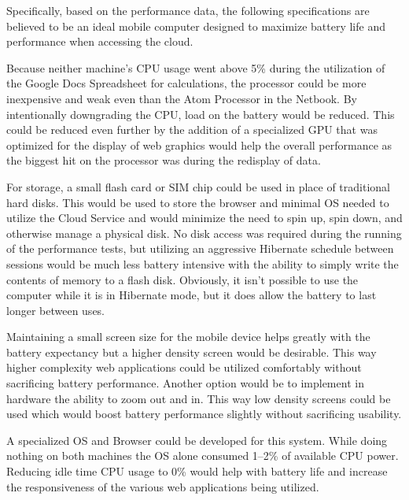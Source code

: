 Specifically, based on the performance data, the following specifications are
believed to be an ideal mobile computer designed to maximize battery life and
performance when accessing the cloud.

Because neither machine's CPU usage went above 5\% during the utilization of the
Google Docs Spreadsheet for calculations, the processor could be more
inexpensive and weak even than the Atom Processor in the Netbook.  By
intentionally downgrading the CPU, load on the battery would be reduced.  This
could be reduced even further by the addition of a specialized GPU that was
optimized for the display of web graphics would help the overall performance as
the biggest hit on the processor was during the redisplay of data.

For storage, a small flash card or SIM chip could be used in place of
traditional hard disks.  This would be used to store the browser and minimal OS
needed to utilize the Cloud Service and would minimize the need to spin up, spin
down, and otherwise manage a physical disk.  No disk access was required during
the running of the performance tests, but utilizing an aggressive Hibernate
schedule between sessions would be much less battery intensive with the ability
to simply write the contents of memory to a flash disk.  Obviously, it isn't
possible to use the computer while it is in Hibernate mode, but it does allow
the battery to last longer between uses.

Maintaining a small screen size for the mobile device helps greatly with the
battery expectancy but a higher density screen would be desirable.  This way
higher complexity web applications could be utilized comfortably without
sacrificing battery performance.  Another option would be to implement in
hardware the ability to zoom out and in.  This way low density screens could be
used which would boost battery performance slightly without sacrificing
usability.

A specialized OS and Browser could be developed for this system.  While doing
nothing on both machines the OS alone consumed 1--2\% of available CPU power.
Reducing idle time CPU usage to 0\% would help with battery life and increase
the responsiveness of the various web applications being utilized.


